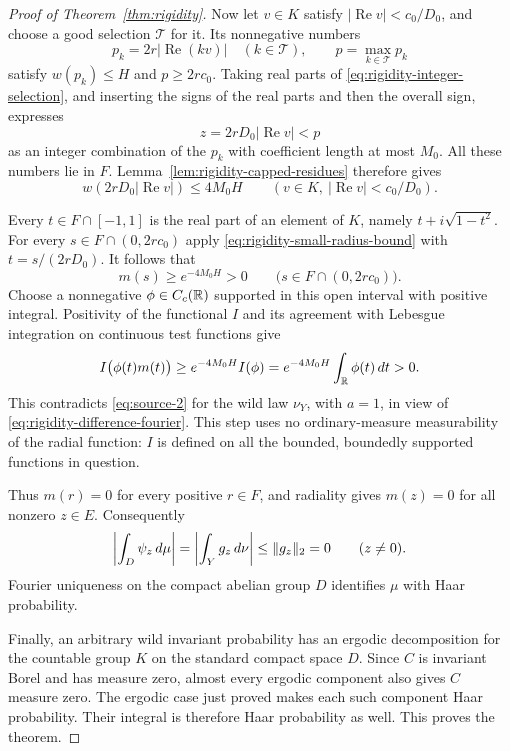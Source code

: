 \begin{proof}[Proof of Theorem~\ref{thm:rigidity}]
Now let $v\in K$ satisfy $|\operatorname{Re}v|<c_0/D_0$, and choose a
good selection $\mathcal T$ for it.  Its nonnegative numbers
\[
 p_k=2r|\operatorname{Re}(kv)|\quad(k\in\mathcal T),
 \qquad p=\max_{k\in\mathcal T}p_k
\]
satisfy $w(p_k)\leq H$ and $p\geq2rc_0$.  Taking real parts of
\eqref{eq:rigidity-integer-selection}, and inserting the signs of the
real parts and then the overall sign, expresses
\[
 z=2rD_0|\operatorname{Re}v|<p
\]
as an integer combination of the $p_k$ with coefficient length at most
$M_0$.  All these numbers lie in $F$.  Lemma~\ref{lem:rigidity-capped-residues}
therefore gives
\begin{equation}\label{eq:rigidity-small-radius-bound}
 w(2rD_0|\operatorname{Re}v|)\leq4M_0H
 \qquad\left(v\in K,\ |\operatorname{Re}v|<c_0/D_0\right).
\end{equation}

Every $t\in F\cap[-1,1]$ is the real part of an element of $K$, namely
$t+i\sqrt{1-t^2}$.  For every $s\in F\cap(0,2rc_0)$ apply
\eqref{eq:rigidity-small-radius-bound} with
$t=s/(2rD_0)$.  It follows that
\[
 m(s)\geq e^{-4M_0H}>0
 \qquad\bigl(s\in F\cap(0,2rc_0)\bigr).
\]
Choose a nonnegative $\phi\in C_c(\mathbb R)$ supported in this open interval
with positive integral.  Positivity of the functional $I$ and its
agreement with Lebesgue integration on continuous test functions give
\[
 I\bigl(\phi(t)m(t)\bigr)
 \geq e^{-4M_0H}I(\phi)
 =e^{-4M_0H}\int_\mathbb R\phi(t)\,dt>0.
\]
This contradicts \eqref{eq:source-2} for the wild law $\nu_Y$, with
$a=1$, in view of \eqref{eq:rigidity-difference-fourier}.  This step
uses no ordinary-measure measurability of the radial function: $I$ is
defined on all the bounded, boundedly supported functions in question.

Thus $m(r)=0$ for every positive $r\in F$, and radiality gives $m(z)=0$
for all nonzero $z\in E$.  Consequently
\[
 \left|\int_D\psi_z\,d\mu\right|
 =\left|\int_Yg_z\,d\nu\right|
 \leq\lVert g_z\rVert_2=0\qquad(z\ne0).
\]
Fourier uniqueness on the compact abelian group $D$ identifies $\mu$
with Haar probability.

Finally, an arbitrary wild invariant probability has an ergodic
decomposition for the countable group $K$ on the standard compact space
$D$.  Since $C$ is invariant Borel and has measure zero, almost every
ergodic component also gives $C$ measure zero.  The ergodic case just
proved makes each such component Haar probability.  Their integral is
therefore Haar probability as well.  This proves the theorem.
\end{proof}

